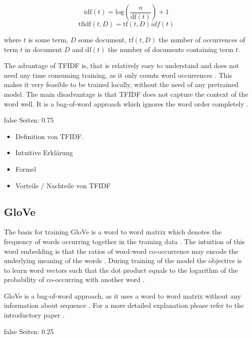 \documentclass[draft,final,oneside]{vutinfth} %
\begin{document}
\begin{equation}
\text{idf}(t) = \text{log} \left(\dfrac{n}{\text{df}(t)} \right) + 1
\end{equation}
\begin{equation}
\text{tfidf}(t, D) = \text{tf}(t, D)idf(t)
\end{equation}


where $t$ is some term, $D$ some document, $\text{tf}(t, D)$ the number of occurrences of term $t$ in document $D$ and $\text{df}(t)$ the number of documents containing term $t$.

The advantage of TFIDF is, that is relatively easy to understand and does not need any time consuming training, as it only counts word occurrences \cite{irsurvey}. This makes it very feasible to be trained locally, without the need of any pretrained model. The main disadvantage is that TFIDF does not capture the context of the word well. It is a bag-of-word approach which ignores the word order completely \cite{irsurvey}.

\if false
Seiten: 0.75

\begin{itemize}
\item Definition von TFIDF. 
\item Intuitive Erklärung
\item Formel
\item Vorteile / Nachteile von TFIDF
\end{itemize}

\fi

\subsection{GloVe}
The basis for training GloVe is a word to word matrix which denotes the frequency of words occurring together in the training data \cite{glovepage}. The intuition of this word embedding is that the ratios of word-word co-occurrence may encode the underlying meaning of the words \cite{pennington2014glove}. During training of the model the objective is to learn word vectors such that the dot product equals to the logarithm of the probability of co-occurring with another word \cite{pennington2014glove}.

GloVe is a bag-of-word approach, as it uses a word to word matrix without any information about sequence \cite{pennington2014glove}. For a more detailed explanation please refer to the introductory paper \cite{pennington2014glove}.

\if false
Seiten: 0.25
\end{document}
